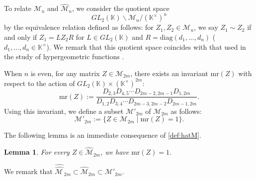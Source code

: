 \documentclass[11pt]{amsart}
\theoremstyle{plain}
\newtheorem{lemma}[proposition]{Lemma}
\theoremstyle{definition}
\theoremstyle{remark}
\begin{document}

To relate $\mathcal{M}_n$ and $\widehat{\mathcal{M}}_n$, we consider the quotient space
\begin{equation}
GL_2(\mathbb{K})\backslash \mathcal{M}_n/(\mathbb{K}^\times)^n \label{eq:quotient}
\end{equation}
by the equivalence relation defined as follows: for $Z_1, Z_2 \in \mathcal{M}_n$, we say
$Z_1 \sim Z_2$ if and only if $Z_1=LZ_2 R$ for $L\in GL_2(\mathbb{K})$ and $R=\mathrm{diag}(d_1, \ldots, d_n)$
($d_1, \ldots, d_n \in \mathbb{K}^\times$).
We remark that this quotient space coincides with that used in the study of
hypergeometric functions \cite{GGR1992,Kimura2007}.

When $n$ is even, for any matrix $Z \in \mathcal{M}_{2m}$, there exists an invariant
$\mathrm{mr}(Z)$ with respect to the action of $GL_2(\mathbb{K}) \times (\mathbb{K}^\times)^{2m}$:
\begin{equation}
    \mathrm{mr}(Z) := \frac{D_{2,3} D_{4,5} \cdots D_{2m-2,2m-1} D_{1,2m}}{D_{1,2} D_{3,4} \cdots D_{2m-3,2m-2}D_{2m-1,2m}}. \label{eq:Phi}
\end{equation}
Using this invariant, we define a subset $\mathcal{M}'_{2m}$ of $\mathcal{M}_{2m}$ as follows:
\begin{equation} \label{def:M'}
    \mathcal{M}'_{2m} := \{ Z \in \mathcal{M}_{2m} \mid \mathrm{mr}(Z) = 1 \}.
\end{equation}

The following lemma is an immediate consequence of \eqref{def:hatM}.
\begin{lemma}
For every $Z \in \widehat{\mathcal{M}}_{2m}$, we have $\mathrm{mr}(Z)=1$.
\end{lemma}
We remark that $\widehat{\widehat{\mathcal{M\,}}}_{2m} \subset \widehat{\mathcal{M}}_{2m} \subset \mathcal{M}'_{2m}$.
\end{document}
